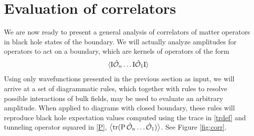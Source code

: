 \documentclass[12pt]{article}
\newcommand{\be}{\begin{equation}}
\newcommand{\ee}{\end{equation}}
\newcommand{\blangle}{\bigl\langle}
\newcommand{\brangle}{\bigr\rangle}
\newcommand*{\corr}[1]{\langle{#1}\rangle}
\newcommand*{\bcorr}[1]{\blangle{#1}\brangle}
\newcommand{\calO}{\mathcal{O}}
\DeclareMathOperator{\tr}{tr}
\begin{document}
\section{Evaluation of correlators}



We are now ready to present a general analysis of correlators of matter operators in black hole states of the boundary. We will actually analyze amplitudes for operators to act on a boundary, which are kernels of operators of the form 
\be\label{ampop}
\corr{{\rm I}\hat{\calO}_{n}\dots {\rm I} \hat{\calO}_{1}{\rm I}}
\ee
Using only wavefunctions presented in the previous section as input, we will arrive at a set of diagrammatic rules, which together with rules to resolve possible interactions of bulk fields, may be used to evaluate an arbitrary amplitude. When applied to diagrams with closed boundary, these rules will reproduce black hole expectation values computed using the trace in \eqref{trdef} and tunneling operator squared in \eqref{P}, $\bcorr{\tr({\rm P} \,\hat{\calO}_{n}\dots \hat{\calO}_{1})}$. See Figure \ref{fig:corr}.
\end{document}
